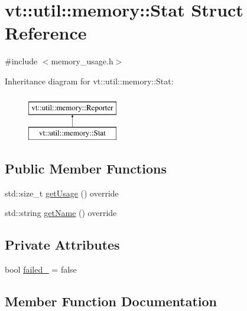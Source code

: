 \hypertarget{structvt_1_1util_1_1memory_1_1_stat}{}\section{vt\+:\+:util\+:\+:memory\+:\+:Stat Struct Reference}
\label{structvt_1_1util_1_1memory_1_1_stat}


{\ttfamily \#include $<$memory\+\_\+usage.\+h$>$}

Inheritance diagram for vt\+:\+:util\+:\+:memory\+:\+:Stat\+:\begin{figure}[H]
\begin{center}
\leavevmode
\includegraphics[height=2.000000cm]{structvt_1_1util_1_1memory_1_1_stat}
\end{center}
\end{figure}
\subsection*{Public Member Functions}
\begin{DoxyCompactItemize}
\item 
std\+::size\+\_\+t \hyperlink{structvt_1_1util_1_1memory_1_1_stat_aa14297e6605a523e4164597d45fba06f}{get\+Usage} () override
\item 
std\+::string \hyperlink{structvt_1_1util_1_1memory_1_1_stat_a2a29912688c89bcb98d6132ecda6070f}{get\+Name} () override
\end{DoxyCompactItemize}
\subsection*{Private Attributes}
\begin{DoxyCompactItemize}
\item 
bool \hyperlink{structvt_1_1util_1_1memory_1_1_stat_af94103c0d6758baa6386de53c30f6246}{failed\+\_\+} = false
\end{DoxyCompactItemize}


\subsection{Member Function Documentation}
\mbox{\label{structvt_1_1util_1_1memory_1_1_stat_a2a29912688c89bcb98d6132ecda6070f}} 
